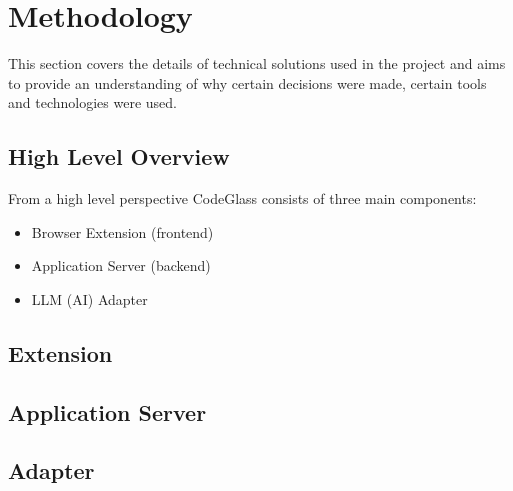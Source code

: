 \section{Methodology}

This section covers the details of technical solutions used in the project and
aims to provide an understanding of why certain decisions were made, certain
tools and technologies were used.

\subsection{High Level Overview}

From a high level perspective CodeGlass consists of three main components:

\begin{itemize}
    \item Browser Extension (frontend)
    \item Application Server (backend)
    \item LLM (AI) Adapter
\end{itemize}

\subsection{Extension}

\subsection{Application Server}

\subsection{Adapter}

